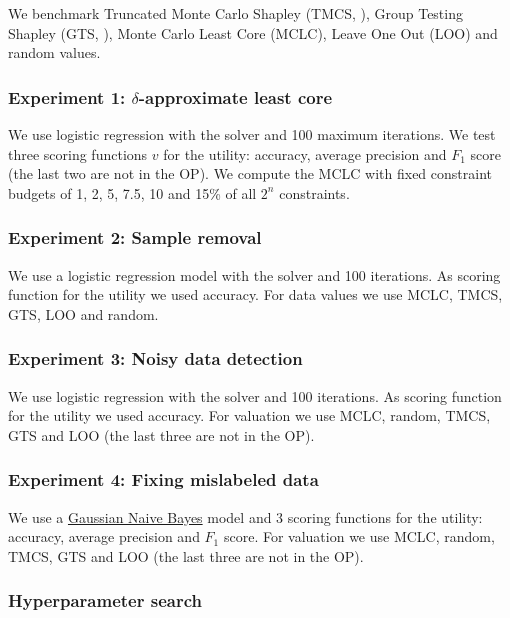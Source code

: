 We benchmark Truncated Monte Carlo Shapley (TMCS,
{\cite{ghorbani_data_2019}}), Group Testing Shapley (GTS,
{\cite{jia_efficient_2019}}), Monte Carlo Least Core (MCLC), Leave One Out
(LOO) and random values.

\subsubsection{Experiment 1: $\delta$-approximate least core}

We use logistic regression with the {} solver and 100
maximum iterations. We test three scoring functions $v$ for the utility:
accuracy, average precision and $F_1$ score (the last two are not in the OP).
We compute the MCLC with fixed constraint budgets of 1, 2, 5, 7.5, 10 and 15\%
of all $2^n$ constraints.

\subsubsection{Experiment 2: Sample removal}

We use a logistic regression model with the {} solver and
100 iterations. As scoring function for the utility we used accuracy. For data
values we use MCLC, TMCS, GTS, LOO and random.

\subsubsection{Experiment 3: Noisy data detection}

We use logistic regression with the {} solver and 100
iterations. As scoring function for the utility we used accuracy. For
valuation we use MCLC, random, TMCS, GTS and LOO (the last three are not in
the OP).

\subsubsection{Experiment 4: Fixing mislabeled data}

We use a
\href{https://scikit-learn.org/stable/modules/generated/sklearn.naive\_bayes.GaussianNB.html\#sklearn.naive\_bayes.GaussianNB}{Gaussian
Naive Bayes} model and 3 scoring functions for the utility: accuracy, average
precision and $F_1$ score. For valuation we use MCLC, random, TMCS, GTS and
LOO (the last three are not in the OP).

\subsubsection{Hyperparameter search}

